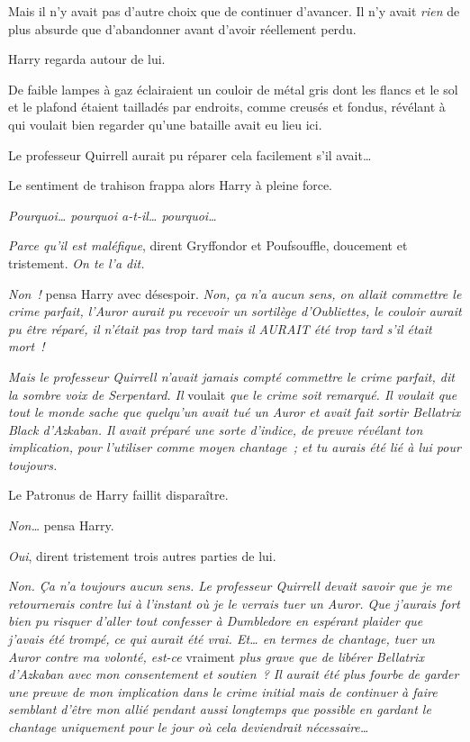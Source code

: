 Mais il n'y avait pas d'autre choix que de continuer d'avancer.
Il n'y avait \emph{rien} de plus absurde que d'abandonner avant d'avoir réellement perdu.

Harry regarda autour de lui.

De faible lampes à gaz éclairaient un couloir de métal gris dont les flancs et le sol et le plafond étaient tailladés par endroits, comme creusés et fondus, révélant à qui voulait bien regarder qu'une bataille avait eu lieu ici.

Le professeur Quirrell aurait pu réparer cela facilement s'il avait…

Le sentiment de trahison frappa alors Harry à pleine force.

\emph{Pourquoi… pourquoi a-t-il… pourquoi…}

\emph{Parce qu'il est maléfique}, dirent Gryffondor et Poufsouffle, doucement et tristement.
\emph{On te l'a dit.}

\emph{Non~!} pensa Harry avec désespoir.
\emph{Non, ça n'a aucun sens, on allait commettre le crime parfait, l'Auror aurait pu recevoir un sortilège d'Oubliettes, le couloir aurait pu être réparé, il n'était pas trop tard mais il AURAIT été trop tard s'il était mort~!}

\emph{Mais le professeur Quirrell n'avait jamais compté commettre le crime parfait, dit la sombre voix de Serpentard.
Il} voulait \emph{que le crime soit remarqué.
Il voulait que tout le monde sache que quelqu'un avait tué un Auror et avait fait sortir Bellatrix Black d'Azkaban.
Il avait préparé une sorte d'indice, de preuve révélant ton implication, pour l'utiliser comme moyen chantage~; et tu aurais été lié à lui pour toujours.}

Le Patronus de Harry faillit disparaître.

\emph{Non…} pensa Harry.

\emph{Oui}, dirent tristement trois autres parties de lui.

\emph{Non.
Ça n'a toujours aucun sens.
Le professeur Quirrell devait savoir que je me retournerais contre lui à l'instant où je le verrais tuer un Auror.
Que j'aurais fort bien pu risquer d'aller tout confesser à Dumbledore en espérant plaider que j'avais été trompé, ce qui aurait été vrai.
Et… en termes de chantage, tuer un Auror contre ma volonté, est-ce} vraiment \emph{plus grave que de libérer Bellatrix d'Azkaban avec mon consentement et soutien~?
Il aurait été plus fourbe de garder une preuve de mon implication dans le crime initial mais de continuer à faire semblant d'être mon allié pendant aussi longtemps que possible en gardant le chantage uniquement pour le jour où cela deviendrait nécessaire…}

